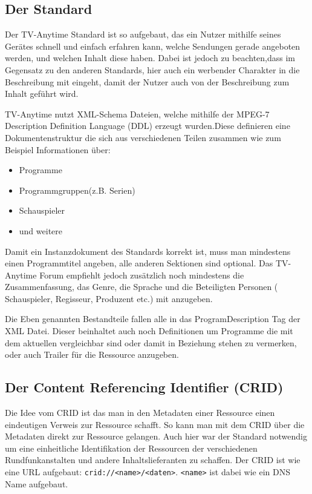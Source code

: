 \subsection{Der Standard}
	Der TV-Anytime Standard ist so aufgebaut, das ein Nutzer mithilfe seines Gerätes schnell und einfach erfahren kann, welche Sendungen gerade angeboten werden, und welchen Inhalt diese haben. Dabei ist jedoch zu beachten,dass im Gegensatz zu den anderen Standards, hier auch ein werbender Charakter in die Beschreibung mit eingeht, damit der Nutzer auch von der Beschreibung zum Inhalt geführt wird.
	
	TV-Anytime nutzt XML-Schema Dateien, welche mithilfe der MPEG-7 Description Definition Language (DDL) erzeugt wurden.Diese definieren eine Dokumentenstruktur die sich aus verschiedenen Teilen zusammen wie zum Beispiel Informationen über:
	\begin{itemize}
		\item Programme
		\item Programmgruppen(z.B. Serien)
		\item Schauspieler
		\item und weitere
	\end{itemize}

	Damit ein Instanzdokument des Standards korrekt ist, muss man mindestens einen Programmtitel angeben, alle anderen Sektionen sind optional. Das TV-Anytime Forum empfiehlt jedoch zusätzlich noch mindestens die Zusammenfassung, das Genre, die Sprache und die Beteiligten Personen ( Schauspieler, Regisseur, Produzent etc.) mit anzugeben.
	
	Die Eben genannten Bestandteile fallen alle in das ProgramDescription Tag der XML Datei. Dieser beinhaltet auch noch Definitionen um Programme die mit dem aktuellen vergleichbar sind oder damit in Beziehung stehen zu vermerken, oder auch Trailer für die Ressource anzugeben.
 
 \subsection{Der Content Referencing Identifier (CRID)}
	Die Idee vom CRID ist das man in den Metadaten einer Ressource einen eindeutigen Verweis zur Ressource schafft. So kann man mit dem CRID über die Metadaten direkt zur Ressource gelangen. Auch hier war der Standard notwendig um eine einheitliche Identifikation der Ressourcen der verschiedenen Rundfunkanstalten und andere Inhaltslieferanten zu schaffen. Der CRID ist wie eine URL aufgebaut: \texttt{crid://<name>/<daten>}. \texttt{<name>} ist dabei wie ein DNS Name aufgebaut.

